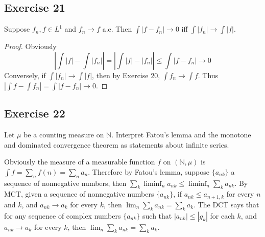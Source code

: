 \subsection*{Exercise 21}
Suppose $f_n,f\in L^1$ and $f_n\to f$ a.e. Then $\int|f-f_n|\to 0$ iff $\int|f_n|\to\int|f|$.
\begin{proof}
    Obviously $$\left|\int|f|-\int|f_n|\right|=\left|\int|f|-|f_n|\right|\le\int|f-f_n|\to 0$$
    Conversely, if $\int|f_n|\to\int|f|$, then by Exercise 20, $\int f_n\to\int f$. Thus $|\int f-\int f_n|=\int|f-f_n|\to 0$.
\end{proof}
\subsection*{Exercise 22}
Let $\mu$ be a counting measure on $\mathbb{N}$. Interpret Fatou's lemma and the monotone and dominated convergence theorem as statements about infinite series.
\begin{solution}
    Obviously the measure of a measurable function $f$ on $(\mathbb{N},\mu)$ is $\int f=\sum_n f(n)=\sum_n a_n$. Therefore by Fatou's lemma, suppose $\{a_{nk}\}$ a sequence of nonnegative numbers, then $\sum_k\liminf_n a_{nk}\le\liminf_n\sum_k a_{nk}$. By MCT, given a sequence of nonnegative numbers $\{a_{nk}\}$, if $a_{nk}\le a_{n+1,k}$ for every $n$ and $k$, and $a_{nk}\to a_{k}$ for every $k$, then $\lim_n\sum_ka_{nk}=\sum_ka_k$. The DCT says that for any sequence of complex numbers $\{a_{nk}\}$ such that $|a_{nk}|\le |g_k|$ for each $k$, and $a_{nk}\to a_k$ for every $k$, then $\lim_n\sum_k a_{nk}=\sum_k a_k$.
\end{solution}